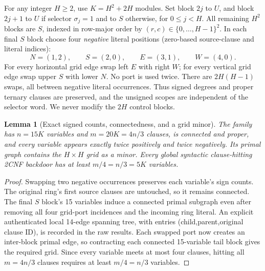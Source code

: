\documentclass[11pt]{article}
\newtheorem{lemma}[theorem]{Lemma}
\begin{document}
For any integer $H\ge2$, use $K=H^2+2H$ modules. Set block $2j$ to $U$, and block $2j+1$ to $U$ if selector $\sigma_j=1$ and to $S$ otherwise, for $0\le j<H$. All remaining $H^2$ blocks are $S$, indexed in row-major order by $(r,c)\in\{0,\dots,H-1\}^2$. In each final $S$ block choose four \emph{negative} literal positions (zero-based source-clause and literal indices):
\[
 N=(1,2),\qquad S=(2,0),\qquad E=(3,1),\qquad W=(4,0).
\]
For every horizontal grid edge swap left $E$ with right $W$; for every vertical grid edge swap upper $S$ with lower $N$. No port is used twice. There are $2H(H-1)$ swaps, all between negative literal occurrences. Thus signed degrees and proper ternary clauses are preserved, and the unsigned scopes are independent of the selector word. We never modify the $2H$ control blocks.

\begin{lemma}[Exact signed counts, connectedness, and a grid minor]
The family has $n=15K$ variables and $m=20K=4n/3$ clauses, is connected and proper, and every variable appears exactly twice positively and twice negatively. Its primal graph contains the $H\times H$ grid as a minor. Every global syntactic clause-hitting 2CNF backdoor has at least $m/4=n/3=5K$ variables.
\end{lemma}
\begin{proof}
Swapping two negative occurrences preserves each variable's sign counts. The original ring's first source clauses are untouched, so it remains connected. The final $S$ block's 15 variables induce a connected primal subgraph even after removing all four grid-port incidences and the incoming ring literal. An explicit authenticated local 14-edge spanning tree, with entries (child,parent,original clause ID), is recorded in the raw results. Each swapped port now creates an inter-block primal edge, so contracting each connected 15-variable tail block gives the required grid. Since every variable meets at most four clauses, hitting all $m=4n/3$ clauses requires at least $m/4=n/3$ variables.
\end{proof}
\end{document}
